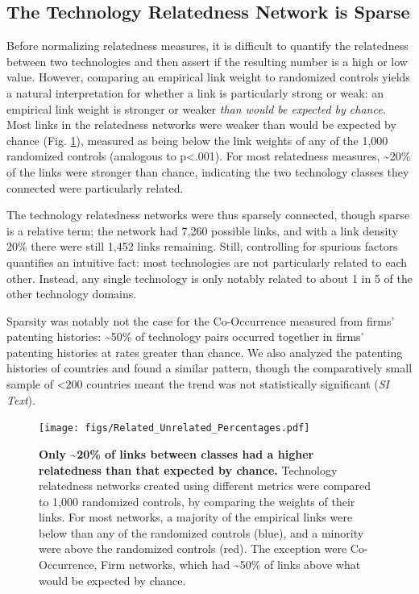 \documentclass[pre,reprint,groupedaddress,superscriptaddress]{revtex4-1}
\begin{document}
\subsection{The Technology Relatedness Network is Sparse}
Before normalizing relatedness measures, it is difficult to quantify the relatedness between two technologies and then assert if the resulting number is a high or low value.
However, comparing an empirical link weight to randomized controls yields a natural interpretation for whether a link is particularly strong or weak: an empirical link weight is stronger or weaker \textit{than would be expected by chance.} Most links in the relatedness networks were weaker than would be expected by chance (Fig. \ref{related_unrelated_percentages}), measured as being below the link weights of any of the 1,000 randomized controls (analogous to p<.001). For most relatedness measures, \textasciitilde{}20\% of the links were stronger than chance, indicating the two technology classes they connected were particularly related. 

The technology relatedness networks were thus sparsely connected, though sparse is a relative term; the network had 7,260 possible links, and with a link density 20\% there were still 1,452 links remaining. Still, controlling for spurious factors quantifies an intuitive fact: most technologies are not particularly related to each other. Instead, any single technology is only notably related to about 1 in 5 of the other technology domains.

Sparsity was notably not the case for the Co-Occurrence measured from firms' patenting histories: \textasciitilde{}50\% of technology pairs occurred together in firms' patenting histories at rates greater than chance. We also analyzed the patenting histories of countries and found a similar pattern, though the comparatively small sample of <200 countries meant the trend was not statistically significant (\textit{SI Text}).

\begin{figure}[]
\begin{center}
\texttt{[image: figs/Related\_Unrelated\_Percentages.pdf]} 
\end{center}
\caption{\textbf{Only \textasciitilde{}20\% of links between classes had a higher relatedness than that expected by chance.} Technology relatedness networks created using different metrics were compared to 1,000 randomized controls, by comparing the weights of their links. For most networks, a majority of the empirical links were below than any of the randomized controls (blue), and a minority were above the randomized controls (red). The exception were Co-Occurrence, Firm networks, which had \textasciitilde{}50\% of links above what would be expected by chance. 
}\label{related_unrelated_percentages}
\end{figure}
\end{document}
